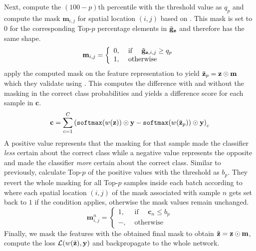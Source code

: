 Next, \citet{huang2020selfchallenging} compute the $(100-p)\mathrm{th}$ percentile with the threshold value as $q_p$ and compute the mask $\mathbf{m}_{i,j}$ for spatial location $(i,j)$ based on . This mask is set to $0$ for the corresponding Top-$p$ percentage elements in $\Tilde{\mathbf{g}}_\mathbf{z}$ and therefore has the same shape. 
\begin{equation}
\mathbf{m}_{i,j}=\left\{\begin{array}{ll}
0, & \text { if } \quad \Tilde{\mathbf{g}}_{\mathbf{z}, i, j} \geq q_{p} \\
1, & \text { otherwise }
\end{array}\right.
\label{eq:Masking}
\end{equation}
\citet{huang2020selfchallenging} apply the computed mask on the feature representation to yield $\Tilde{\mathbf{z}}_p = \mathbf{z} \odot \mathbf{m}$ which they validate using . This computes the difference with and without the masking in the correct class probabilities and yields a difference score for each sample in $\mathbf{c}$.  
\begin{equation}
   \mathbf{c} = \sum_{c=1}^C  \left(\mathtt{softmax}(w(\mathbf{z})) \odot \mathbf{y} - \mathtt{softmax}(w(\Tilde{\mathbf{z}}_p)) \odot \mathbf{y} \right)_c
   \label{eq:changeval}
\end{equation}
A positive value represents that the masking for that sample made the classifier \emph{less} certain about the correct class while a negative value represents the opposite and made the classifier \emph{more} certain about the correct class. Similar to previously, \citet{huang2020selfchallenging} calculate Top-$p$ of the positive values with the threshold as $b_p$. They revert the whole masking for all Top-$p$ samples inside each batch according to  where each spatial location $(i,j)$ of the mask associated with sample $n$ gets set back to $1$ if the condition applies, otherwise the mask values remain unchanged.
\begin{equation}
    \mathbf{m}^n_{i,j}=\left\{\begin{array}{ll}
1, & \text { if } \quad \mathbf{c}_n \leq b_{p} \\
-, & \text { otherwise }
\end{array}\right.
\label{eq:MaskingReversion}
\end{equation}
Finally, we mask the features with the obtained final mask to obtain $\Tilde{\mathbf{z}} = \mathbf{z} \odot \mathbf{m}$, compute the loss $\mathcal{L}(w(\Tilde{\mathbf{z}}), \mathbf{y})$ and backpropagate to the whole network.

